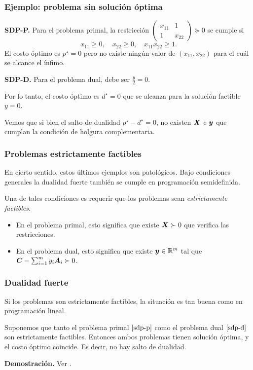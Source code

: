 \documentclass[aspectratio=169,12pt,spanish]{beamer}
\begin{document}
\begin{frame}
\frametitle{Ejemplo: problema sin solución óptima}

\textbf{SDP-P.} Para el problema primal, la restricción
$\begin{pmatrix} x_{11} & 1 \\ 1 & x_{22}\end{pmatrix} \succeq 0$
se cumple si
$$x_{11} \ge 0, \quad x_{22} \ge 0, \quad x_{11}x_{22} \ge 1.$$
El costo óptimo es $p^\star = 0$ pero no existe ningún valor de $(x_{11}, x_{22})$ para el cuál se alcance el ínfimo.

\textbf{SDP-D.} Para el problema dual, debe ser $\frac{y}{2} = 0$.

Por lo tanto, el costo óptimo es $d^\star = 0$ que se alcanza para la solución factible $y = 0$.

Vemos que si bien el salto de dualidad $p^\star - d^\star = 0$, no existen $\bm{X}$ e $\bm{y}$ que cumplan la condición de holgura complementaria.

\end{frame}


\begin{frame}
\frametitle{Problemas estrictamente factibles}

En cierto sentido, estos últimos ejemplos son patológicos. Bajo condiciones generales la dualidad fuerte también se cumple en programación semidefinida.

Una de tales condiciones es requerir que los problemas sean \emph{estrictamente factibles}.

\begin{itemize}
\item En el problema primal, esto significa que existe $\bm{X} \succ 0$ que verifica las restricciones.
\item En el problema dual, esto significa que existe $\bm{y} \in \mathbb{R}^m$ tal que $\bm{C} - \sum_{i=1}^m y_i \bm{A}_i \succ 0$.
\end{itemize}



\end{frame}


\begin{frame}
\frametitle{Dualidad fuerte}

Si los problemas son estrictamente factibles, la situación es tan buena como en programación lineal.

\begin{theorem} Suponemos que tanto el problema primal $\eqref{sdp-p}$ como el problema dual $\eqref{sdp-d}$ son estrictamente factibles. Entonces ambos problemas tienen solución óptima, y el costo óptimo coincide. Es decir, no hay salto de dualidad.
\end{theorem}

\textbf{Demostración.} Ver \cite[Teorema 4.1]{Todd2001}.



\end{frame}
\end{document}

